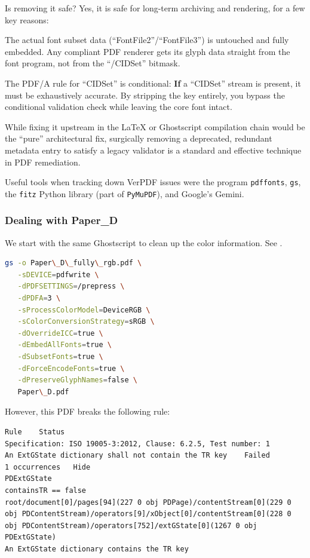 \documentclass[12pt, twoside]{article}
\begin{document}
Is removing it safe? Yes, it is safe for long-term archiving and rendering, for a few key reasons:
\begin{description}[style=nextline, labelwidth=\widthof{\textbf{The Source of Truth Remains}}, leftmargin=!]
    \item [The Source of Truth Remains] The actual font subset data (\enquote{FontFile2}/\enquote{FontFile3}) is untouched and fully embedded. Any compliant PDF renderer gets its glyph data straight from the font program, not from the \enquote{/CIDSet} bitmask.
    \item [Bypassing the Rule] The PDF/A rule for \enquote{CIDSet} is conditional: \textbf{If} a \enquote{CIDSet} stream is present, it must be exhaustively accurate. By stripping the key entirely, you bypass the conditional validation check while leaving the core font intact.
\end{description}
While fixing it upstream in the \LaTeX{} or Ghostscript compilation chain would be the \enquote{pure} architectural fix, surgically removing a deprecated, redundant metadata entry to satisfy a legacy validator is a standard and effective technique in PDF remediation.

Useful tools when tracking down VerPDF issues were the program \texttt{pdffonts}, \texttt{gs}, the \texttt{fitz} Python library (part of \texttt{PyMuPDF}), and Google's Gemini.



\subsubsection{Dealing with Paper\_D}
\label{sec:dealingWithPaperD}
We start with the same Ghostscript to clean up the color information. See .
\begin{lstlisting}[language={bash}, caption={Using ghostscript to correct the Paper\_D PDF file},label=lst:cleanPaperD]
gs -o Paper\_D\_fully\_rgb.pdf \
   -sDEVICE=pdfwrite \
   -dPDFSETTINGS=/prepress \
   -dPDFA=3 \
   -sProcessColorModel=DeviceRGB \
   -sColorConversionStrategy=sRGB \
   -dOverrideICC=true \
   -dEmbedAllFonts=true \
   -dSubsetFonts=true \
   -dForceEncodeFonts=true \
   -dPreserveGlyphNames=false \
   Paper\_D.pdf
\end{lstlisting}

However, this \gls{PDF} breaks the following rule:
\begin{verbatim}
Rule	Status
Specification: ISO 19005-3:2012, Clause: 6.2.5, Test number: 1	
An ExtGState dictionary shall not contain the TR key	Failed
1 occurrences	Hide
PDExtGState	
containsTR == false	
root/document[0]/pages[94](227 0 obj PDPage)/contentStream[0](229 0 obj PDContentStream)/operators[9]/xObject[0]/contentStream[0](228 0 obj PDContentStream)/operators[752]/extGState[0](1267 0 obj PDExtGState)
An ExtGState dictionary contains the TR key
\end{verbatim}
\end{document}
